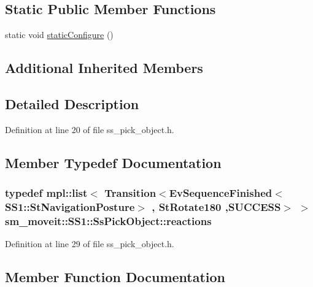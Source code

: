 \subsection*{Static Public Member Functions}
\begin{DoxyCompactItemize}
\item 
static void \hyperlink{structsm__moveit_1_1SS1_1_1SsPickObject_ab589ae81913b79dda9f94d03e5b0fa86}{static\+Configure} ()
\end{DoxyCompactItemize}
\subsection*{Additional Inherited Members}


\subsection{Detailed Description}


Definition at line 20 of file ss\+\_\+pick\+\_\+object.\+h.



\subsection{Member Typedef Documentation}
\subsubsection[{\texorpdfstring{reactions}{reactions}}]{\setlength{\rightskip}{0pt plus 5cm}typedef mpl\+::list$<$ Transition$<$Ev\+Sequence\+Finished$<$S\+S1\+::\+St\+Navigation\+Posture$>$ , {\bf St\+Rotate180} ,{\bf S\+U\+C\+C\+E\+SS}$>$ $>$ {\bf sm\+\_\+moveit\+::\+S\+S1\+::\+Ss\+Pick\+Object\+::reactions}}\hypertarget{structsm__moveit_1_1SS1_1_1SsPickObject_a2d0c00287bd2081d8c92495ef5227e5e}{}\label{structsm__moveit_1_1SS1_1_1SsPickObject_a2d0c00287bd2081d8c92495ef5227e5e}


Definition at line 29 of file ss\+\_\+pick\+\_\+object.\+h.



\subsection{Member Function Documentation}
